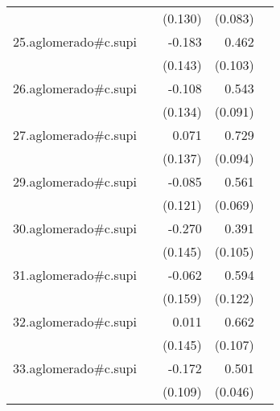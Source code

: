 {\begin{longtable}{l*{4}{D{.}{.}{-1}}}
            &                     &     (0.130)         &     (0.083)         &                     \\
\addlinespace
25.aglomerado#c.supi&                     &      -0.183         &       0.462\sym{***}&                     \\
            &                     &     (0.143)         &     (0.103)         &                     \\
\addlinespace
26.aglomerado#c.supi&                     &      -0.108         &       0.543\sym{***}&                     \\
            &                     &     (0.134)         &     (0.091)         &                     \\
\addlinespace
27.aglomerado#c.supi&                     &       0.071         &       0.729\sym{***}&                     \\
            &                     &     (0.137)         &     (0.094)         &                     \\
\addlinespace
29.aglomerado#c.supi&                     &      -0.085         &       0.561\sym{***}&                     \\
            &                     &     (0.121)         &     (0.069)         &                     \\
\addlinespace
30.aglomerado#c.supi&                     &      -0.270         &       0.391\sym{***}&                     \\
            &                     &     (0.145)         &     (0.105)         &                     \\
\addlinespace
31.aglomerado#c.supi&                     &      -0.062         &       0.594\sym{***}&                     \\
            &                     &     (0.159)         &     (0.122)         &                     \\
\addlinespace
32.aglomerado#c.supi&                     &       0.011         &       0.662\sym{***}&                     \\
            &                     &     (0.145)         &     (0.107)         &                     \\
\addlinespace
33.aglomerado#c.supi&                     &      -0.172         &       0.501\sym{***}&                     \\
            &                     &     (0.109)         &     (0.046)         &                     \\

\end{longtable}}
